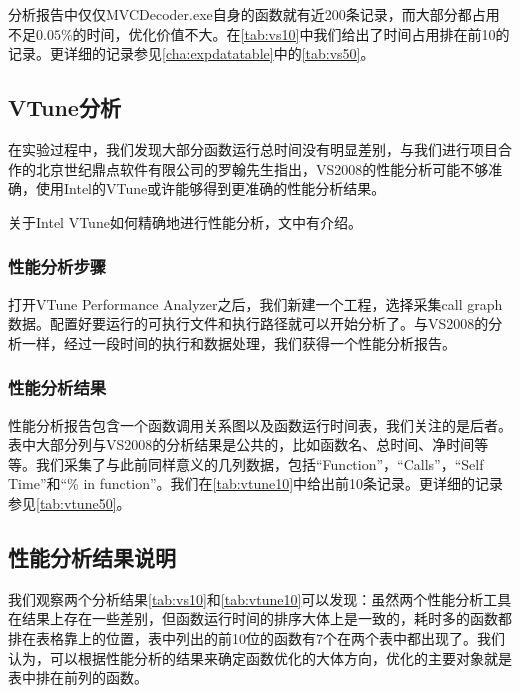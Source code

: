 

分析报告中仅仅MVCDecoder.exe自身的函数就有近200条记录，而大部分都占用不足$0.05\%$的时间，优化价值不大。在\autoref{tab:vs10}中我们给出了时间占用排在前10的记录。更详细的记录参见\autoref{cha:expdatatable}中的\autoref{tab:vs50}。

\subsection{VTune分析}
\label{subsec:vtuneprofiling}

在实验过程中，我们发现大部分函数运行总时间没有明显差别，与我们进行项目合作的北京世纪鼎点软件有限公司的罗翰先生指出，VS2008的性能分析可能不够准确，使用Intel的VTune或许能够得到更准确的性能分析结果。

关于Intel VTune如何精确地进行性能分析，文中有介绍。

\subsubsection{性能分析步骤}
\label{subsubsec:profilingprocess}

打开VTune Performance Analyzer之后，我们新建一个工程，选择采集call graph数据。配置好要运行的可执行文件和执行路径就可以开始分析了。与VS2008的分析一样，经过一段时间的执行和数据处理，我们获得一个性能分析报告。

\subsubsection{性能分析结果}
\label{subsubsec:reportexerpt}



性能分析报告包含一个函数调用关系图以及函数运行时间表，我们关注的是后者。表中大部分列与VS2008的分析结果是公共的，比如函数名、总时间、净时间等等。我们采集了与此前同样意义的几列数据，包括“Function”，“Calls”，“Self Time”和“\% in function”。我们在\autoref{tab:vtune10}中给出前10条记录。更详细的记录参见\autoref{tab:vtune50}。


\subsection{性能分析结果说明}
\label{subsec:commentonreport}

我们观察两个分析结果\autoref{tab:vs10}和\autoref{tab:vtune10}可以发现：虽然两个性能分析工具在结果上存在一些差别，但函数运行时间的排序大体上是一致的，耗时多的函数都排在表格靠上的位置，表中列出的前10位的函数有7个在两个表中都出现了。我们认为，可以根据性能分析的结果来确定函数优化的大体方向，优化的主要对象就是表中排在前列的函数。

